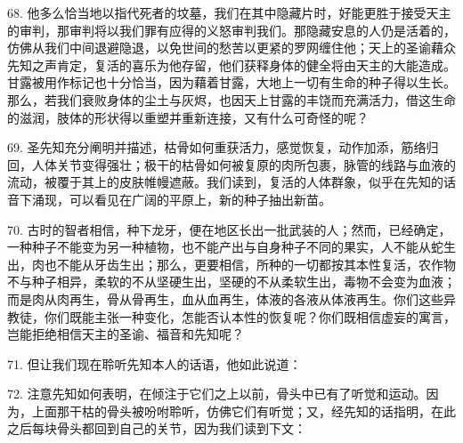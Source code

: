 68. 他多么恰当地以指代死者的坟墓，我们在其中隐藏片时，好能更胜于接受天主的审判，那审判将以我们罪有应得的义怒审判我们。那隐藏安息的人仍是活着的，仿佛从我们中间退避隐退，以免世间的愁苦以更紧的罗网缠住他；天上的圣谕藉众先知之声肯定，复活的喜乐为他存留，他们获释身体的健全将由天主的大能造成。甘露被用作标记也十分恰当，因为藉着甘露，大地上一切有生命的种子得以生长。那么，若我们衰败身体的尘土与灰烬，也因天上甘露的丰饶而充满活力，借这生命的滋润，肢体的形状得以重塑并重新连接，又有什么可奇怪的呢？\par

69. 圣先知充分阐明并描述，枯骨如何重获活力，感觉恢复，动作加添，筋络归回，人体关节变得强壮；极干的枯骨如何被复原的肉所包裹，脉管的线路与血液的流动，被覆于其上的皮肤帷幔遮蔽。我们读到，复活的人体群象，似乎在先知的话音下涌现，可以看见在广阔的平原上，新的种子抽出新苗。\par

70. 古时的智者相信，种下龙牙，便在地区长出一批武装的人；然而，已经确定，一种种子不能变为另一种植物，也不能产出与自身种子不同的果实，人不能从蛇生出，肉也不能从牙齿生出；那么，更要相信，所种的一切都按其本性复活，农作物不与种子相异，柔软的不从坚硬生出，坚硬的不从柔软生出，毒物不会变为血液；而是肉从肉再生，骨从骨再生，血从血再生，体液的各液从体液再生。你们这些异教徒，你们既能主张一种变化，怎能否认本性的恢复呢？你们既相信虚妄的寓言，岂能拒绝相信天主的圣谕、福音和先知呢？\par

71. 但让我们现在聆听先知本人的话语，他如此说道：\par

72. 注意先知如何表明，在倾注于它们之上以前，骨头中已有了听觉和运动。因为，上面那干枯的骨头被吩咐聆听，仿佛它们有听觉；又，经先知的话指明，在此之后每块骨头都回到自己的关节，因为我们读到下文：\par

